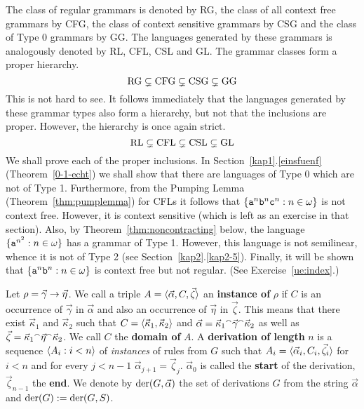 The class of regular grammars is denoted by RG,  the class of all
context free grammars by CFG, the class of context sensitive
grammars by CSG and the class of Type 0 grammars by GG.
The languages generated by these grammars is analogously denoted by
RL, CFL, CSL and GL. The grammar classes form a
proper hierarchy.
\begin{equation}
\mbox{\rm RG} \subsetneq \mbox{\rm CFG} \subsetneq \mbox{\rm CSG}
\subsetneq \mbox{\rm GG}
\end{equation}
This is not hard to see. It follows immediately that the languages
generated by these grammar types also form a hierarchy, but not 
that the inclusions are proper. However, the hierarchy is once again 
strict.
\begin{equation}
\mbox{\rm RL} \subsetneq \mbox{\rm CFL} \subsetneq \mbox{\rm CSL}
\subsetneq \mbox{\rm GL}
\end{equation}
We shall prove each of the proper inclusions. In 
Section~\ref{kap1}.\ref{einsfuenf}
(Theorem~\ref{0-1-echt}) we shall show that there are languages of
Type 0 which are not of Type 1. Furthermore, from the Pumping Lemma
(Theorem~\ref{thm:pumplemma}) for CFLs it follows
that $\{\mbox{\tt a}^n \mbox{\tt b}^n \mbox{\tt c}^n : n \in \omega\}$
is not context free. However, it is context sensitive (which is left
as an exercise in that section). Also, by Theorem~\ref{thm:noncontracting} 
below, the language $\{\mbox{\tt a}^{n^2} : n \in \omega\}$ has a grammar 
of Type 1. However, this language is not semilinear, whence it is not 
of Type 2 (see Section~\ref{kap2}.\ref{kap2-5}). Finally, it will be shown that
$\{\mbox{\tt a}^n \mbox{\tt b}^n : n \in \omega\}$
is context free but not regular.  (See Exercise~\ref{ue:index}.)

Let $\rho = \vec{\gamma} \rightarrow \vec{\eta}$.
We call a triple $A = \langle \vec{\alpha}, C, \vec{\zeta}\rangle$
an \textbf{instance of} $\rho$ if $C$ is an occurrence of
$\vec{\gamma}$ in $\vec{\alpha}$ and also an occurrence of
$\vec{\eta}$ in $\vec{\zeta}$.  This means that there exist 
$\vec{\kappa}_1$ and $\vec{\kappa}_2$ such that
$C = \langle \vec{\kappa}_1, \vec{\kappa}_2\rangle$ and
$\vec{\alpha} = \vec{\kappa}_1 {^{\smallfrown}} \vec{\gamma}
{^{\smallfrown}} \vec{\kappa}_2$ as well as $\vec{\zeta} =
\vec{\kappa}_1 {^{\smallfrown}} \vec{\eta} {^{\smallfrown}} \vec{\kappa}_2$.
\label{derivation}
We call $C$ the \textbf{domain of} $A$. A \textbf{derivation of length} 
$n$ is a sequence $\langle A_i : i < n\rangle$ of {\it instances\/} of 
rules from $G$ such that $A_i = \langle \vec{\alpha}_i, C_i,
\vec{\zeta}_i\rangle$ for $i < n$ and for every $j < n-1$ 
$\vec{\alpha}_{j+1} = \vec{\zeta}_j$. $\vec{\alpha}_0$ is 
called the \textbf{start} of the derivation, $\vec{\zeta}_{n-1}$ 
the \textbf{end}. 
We denote by $\operatorname{der}(G,\vec{\alpha})$ the set of derivations
$G$ from the string $\vec{\alpha}$ and $\operatorname{der}(G) := \operatorname{der}(G,S)$. 

